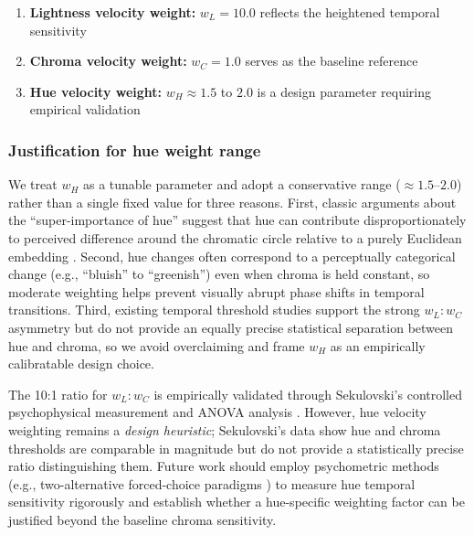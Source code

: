 \begin{enumerate}
    \item \textbf{Lightness velocity weight:} $w_L = 10.0$ reflects the heightened temporal sensitivity \citep{sekulovski2007}
    \item \textbf{Chroma velocity weight:} $w_C = 1.0$ serves as the baseline reference
    \item \textbf{Hue velocity weight:} $w_H \approx 1.5$ to $2.0$ is a design parameter requiring empirical validation
\end{enumerate}

\subsubsection*{Justification for hue weight range}

We treat $w_H$ as a tunable parameter and adopt a conservative range ($\approx 1.5$--$2.0$) rather than a single fixed value for three reasons. First, classic arguments about the ``super-importance of hue'' suggest that hue can contribute disproportionately to perceived difference around the chromatic circle relative to a purely Euclidean embedding \citep{judd1940,nolle2012}. Second, hue changes often correspond to a perceptually categorical change (e.g., ``bluish'' to ``greenish'') even when chroma is held constant, so moderate weighting helps prevent visually abrupt phase shifts in temporal transitions. Third, existing temporal threshold studies support the strong $w_L:w_C$ asymmetry but do not provide an equally precise statistical separation between hue and chroma, so we avoid overclaiming and frame $w_H$ as an empirically calibratable design choice.

The 10:1 ratio for $w_L : w_C$ is empirically validated through Sekulovski's controlled psychophysical measurement and ANOVA analysis \citep[pp.~113--114]{sekulovski2007}. However, hue velocity weighting remains a \emph{design heuristic}; Sekulovski's data show hue and chroma thresholds are comparable in magnitude but do not provide a statistically precise ratio distinguishing them. Future work should employ psychometric methods (e.g., two-alternative forced-choice paradigms \citep{wang2022}) to measure hue temporal sensitivity rigorously and establish whether a hue-specific weighting factor can be justified beyond the baseline chroma sensitivity.


